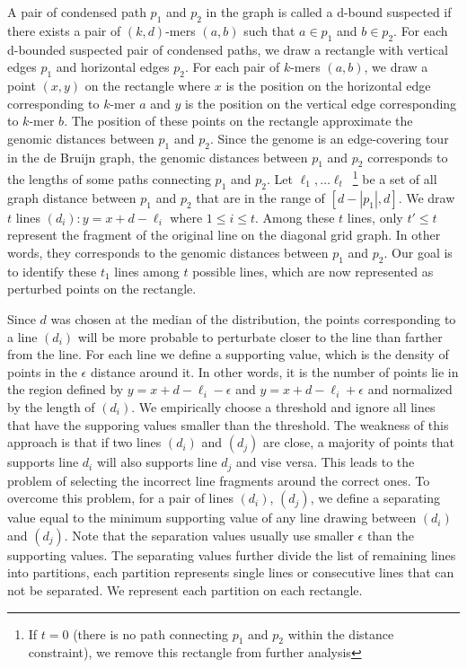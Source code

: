 \documentclass[a4paper]{article}
\begin{document}
A pair of condensed path $p_1$ and $p_2$ in the graph is called a d-bound suspected if there exists 
a pair of $(k,d)$-mers $(a,b)$ such that $a \in p_1$ and $b\in p_2$. For each d-bounded suspected pair of condensed paths, we draw a rectangle with
vertical edges $p_1$ and horizontal edges $p_2$. For each pair of $k$-mers $(a,b)$, we draw a point $(x,y)$  on the rectangle 
where $x$ is the position on the horizontal edge corresponding to $k$-mer $a$ and $y$ is the position on the vertical edge 
corresponding to $k$-mer $b$. The position of these points on the rectangle approximate the genomic  distances between $p_1$ 
and $p_2$. Since the genome is an edge-covering tour in the de Bruijn graph,  the genomic distances between $p_1$ and $p_2$ corresponds to
the lengths of some paths connecting $p_1$ and $p_2$. Let ${\ell_1, \ldots \ell_t}$~\footnote{ If $t = 0$ (there is no path
connecting $p_1$ and $p_2$ within the distance constraint), we remove this rectangle from further analysis} be a set of all graph distance between 
$p_1$ and $p_2$ that are in the range of $[d - |p_1|, d]$.  We draw $t$ lines  $(d_i): y = x + d - \ell_i$ where $ 1 \leq i \leq t$.  Among 
 these $t$ lines, only $t' \leq t$ represent the fragment of the original line on the diagonal grid graph. In other words, 
    they corresponds to the genomic distances between $p_1$ and $p_2$. 
 Our goal is to identify 
these $t_1$ lines among $t$ possible lines, which are now represented as perturbed points on the rectangle.


    Since $d$ was chosen at the median of the distribution, the points corresponding to a line $(d_i)$ will be more probable 
to perturbate closer to the line than farther from the line. For each line we define a supporting value, which is the density of 
points in the $\epsilon$ distance around it. In other words, it is the number of points lie in the region defined by
$y = x + d - \ell_i - \epsilon$ and $y = x + d - \ell_i + \epsilon$ and normalized by the length of $(d_i)$.  We empirically choose 
a threshold and ignore all lines that have the supporing values smaller than the threshold. The weakness of this approach is that 
if two lines $(d_i)$ and $(d_j)$ are close, a majority of points that supports line $d_i$ will also supports line $d_j$ and vise versa.  
This leads to the problem of selecting the incorrect line fragments around the correct ones. To overcome this problem, for a pair of 
lines $(d_i)$, $(d_j)$, we define a separating value equal to the minimum supporting value of any line drawing between $(d_i)$ and $(d_j)$.
Note that the separation values usually use smaller $\epsilon$ than  the supporting values.  The separating values further divide the 
list of remaining lines into partitions, each partition represents single lines or consecutive lines that can not be separated. We 
represent each partition on each rectangle. 
\end{document}

